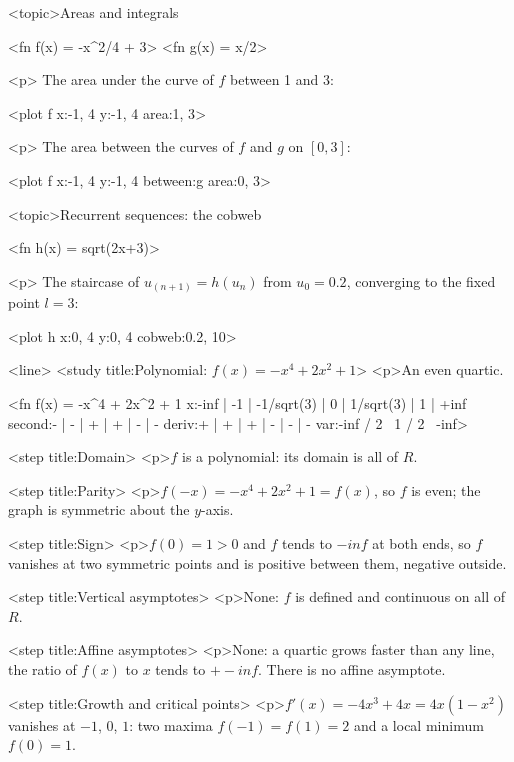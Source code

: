 \documentclass[
  margins=8,
  font=Latin Modern Roman,
  size=12,
  linespread=1.4,
  lang=en,
  precision=4
]{scholatex}
\begin{document}
<topic>Areas and integrals

<fn f(x) = -x^2/4 + 3>
<fn g(x) = x/2>

<p>{ The area under the curve of $f$ between 1 and 3: }

<plot f x:{-1, 4} y:{-1, 4} area:{1, 3}>

<p>{ The area between the curves of $f$ and $g$ on $[0, 3]$: }

<plot f x:{-1, 4} y:{-1, 4} between:g area:{0, 3}>

<topic>Recurrent sequences: the cobweb

<fn h(x) = sqrt(2x+3)>

<p>{ The staircase of $u_(n+1) = h(u_n)$ from $u_0 = 0.2$, converging to
the fixed point $l = 3$: }

<plot h x:{0, 4} y:{0, 4} cobweb:{0.2, 10}>


<line>
<study title:{Polynomial: $f(x) = -x^4 + 2x^2 + 1$}>{
<p>An even quartic.
}

<fn f(x) = -x^4 + 2x^2 + 1
            x:{-inf | -1 | -1/sqrt(3) | 0 | 1/sqrt(3) | 1 | +inf}
            second:{- | - | + | + | - | -}
            deriv:{+ | + | + | - | - | -}
            var:{-inf / 2 \ 1 / 2 \ -inf}>

<step title:{Domain}>{
<p>$f$ is a polynomial: its domain is all of $R$.
}

<step title:{Parity}>{
<p>$f(-x) = -x^4 + 2x^2 + 1 = f(x)$, so $f$ is even; the graph is
symmetric about the $y$-axis.
}

<step title:{Sign}>{
<p>$f(0) = 1 > 0$ and $f$ tends to $-inf$ at both ends, so $f$ vanishes
at two symmetric points and is positive between them, negative outside.
}

<step title:{Vertical asymptotes}>{
<p>None: $f$ is defined and continuous on all of $R$.
}

<step title:{Affine asymptotes}>{
<p>None: a quartic grows faster than any line, the ratio of $f(x)$ to $x$ tends to $+- inf$. There is no affine asymptote.
}

<step title:{Growth and critical points}>{
<p>$f'(x) = -4x^3 + 4x = 4x(1 - x^2)$ vanishes at $-1$, $0$, $1$: two
maxima $f(-1) = f(1) = 2$ and a local minimum $f(0) = 1$.
}
\end{document}
